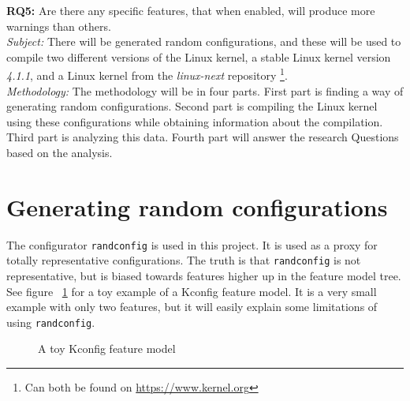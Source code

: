 \documentclass[a4paper,11pt]{report}
\newcommand{\figa}{
    \begin{figure}[!htpb]
    \centering
}
\newcommand{\figb}[2]{
    \caption{#1}
    \label{#2}
    \end{figure}
}
\begin{document}
\textbf{RQ5:} Are there any specific features, that when enabled, will produce 
more warnings than others. 
\\


\emph{Subject:}
There will be generated random configurations, and these will be used to 
compile two different versions of the Linux kernel, a stable Linux kernel 
version \emph{4.1.1}, and a Linux kernel from the \emph{linux-next} repository
    \footnote{Can both be found on \url{https://www.kernel.org}}.
\\

\emph{Methodology:}
The methodology will be in four parts. First part is finding a way of
generating random configurations. Second part is compiling the Linux kernel 
using these configurations while obtaining information about the compilation.
Third part is analyzing this data. Fourth part will answer the research 
Questions based on the analysis.



\section{Generating random configurations}

The configurator \texttt{randconfig} is used in this project. It is used as a 
proxy for totally representative configurations. The truth is that 
\texttt{randconfig} is not representative, but is biased towards features 
higher up in the feature model tree.
\\

See figure ~\ref{randconfigtoy} for a toy example of a Kconfig feature model. 
It is a very small example with only two features, but it will easily explain 
some limitations of using \texttt{randconfig}.

\figa
    
\figb{A toy Kconfig feature model}{randconfigtoy}
\end{document}
